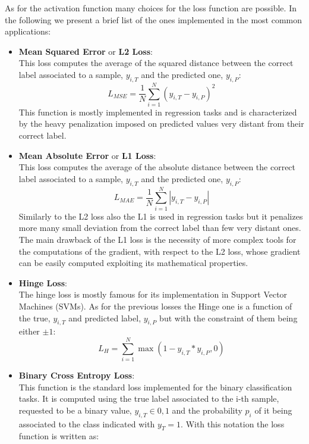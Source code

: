 As for the activation function many choices for the loss function are possible. In the following we present a brief list of the ones implemented in the most common applications:
\begin{itemize}
    \item \textbf{Mean Squared Error} or \textbf{L2 Loss}:\\
    This loss computes the average of the squared distance between the correct label associated to a sample, $y_{i,T}$ and the predicted one, $y_{i,P}$:
    \begin{equation}
        L_{MSE}= \frac{1}{N}\sum_{i=1}^N \left(y_{i,T}-y_{i,P}\right)^2
    \end{equation}
    This function is mostly implemented in regression tasks and is characterized by the heavy penalization imposed on predicted values very distant from their correct label. 
    \item \textbf{Mean Absolute Error} or \textbf{L1 Loss}:\\
    This loss computes the average of the absolute distance between the correct label associated to a sample, $y_{i,T}$ and the predicted one, $y_{i,P}$:
    \begin{equation}
        L_{MAE}= \frac{1}{N}\sum_{i=1}^N \left|y_{i,T}-y_{i,P}\right|
    \end{equation}
    Similarly to the L2 loss also the L1 is used in regression tasks but it penalizes more many small deviation from the correct label than few very distant ones. The main drawback of the L1 loss is the necessity of more complex tools for the computations of the gradient, with respect to the L2 loss, whose gradient can be easily computed exploiting its mathematical properties. 
\item \textbf{Hinge Loss}:\\
    The hinge loss is mostly famous for its implementation in Support Vector Machines (SVMs). As for the previous losses the Hinge one is a function of the true, $y_{i,T}$ and  predicted label, $y_{i,P}$ but with the constraint of them being either $\pm 1$:
    \begin{equation}
        L_{H}= \sum_{i=1}^N \max\left( 1-y_{i,T}*y_{i,P},0\right)
    \end{equation}
\item \textbf{Binary Cross Entropy Loss}:\\
    This function is the standard loss implemented for the binary classification tasks. It is computed using the true label associated to the i-th sample, requested to be a binary value, $y_{i,T}\in{0,1}$ and the probability $p_{i}$ of it being associated to the class indicated with $y_{T}=1$. With this notation the loss function is written as:

\end{itemize}
